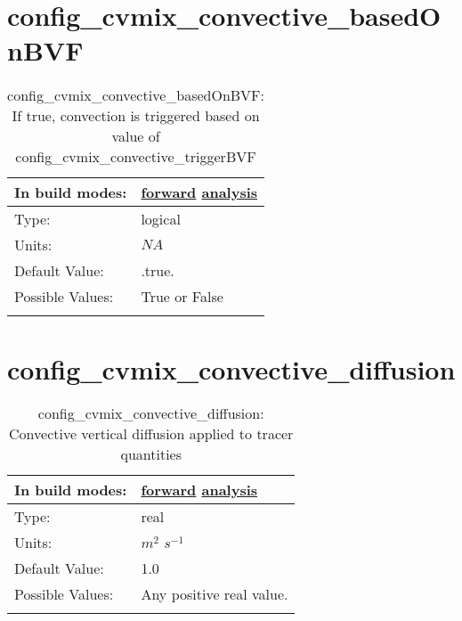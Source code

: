 \section[config\_cvmix\_convective\_basedOnBVF]{config\_cvmix\_convective\_basedOnBVF}
\label{sec:nm_sec_config_cvmix_convective_basedOnBVF}
\begin{center}
\begin{longtable}{| p{2.0in} || p{4.0in} |}
    \hline
    In build modes: & \hyperref[subsec:forward_nm_tab_cvmix]{forward} \hyperref[subsec:analysis_nm_tab_cvmix]{analysis} \\
    \hline
    Type: & logical \\
    \hline
    Units: & $NA$ \\
    \hline
    Default Value: & .true. \\
    \hline
    Possible Values: & True or False \\
    \hline
    \caption{config\_cvmix\_convective\_basedOnBVF: If true, convection is triggered based on value of config\_cvmix\_convective\_triggerBVF}
\end{longtable}
\end{center}
\section[config\_cvmix\_convective\_diffusion]{config\_cvmix\_convective\_diffusion}
\label{sec:nm_sec_config_cvmix_convective_diffusion}
\begin{center}
\begin{longtable}{| p{2.0in} || p{4.0in} |}
    \hline
    In build modes: & \hyperref[subsec:forward_nm_tab_cvmix]{forward} \hyperref[subsec:analysis_nm_tab_cvmix]{analysis} \\
    \hline
    Type: & real \\
    \hline
    Units: & $m^2$ $s^{-1}$ \\
    \hline
    Default Value: & 1.0 \\
    \hline
    Possible Values: & Any positive real value. \\
    \hline
    \caption{config\_cvmix\_convective\_diffusion: Convective vertical diffusion applied to tracer quantities}
\end{longtable}
\end{center}
